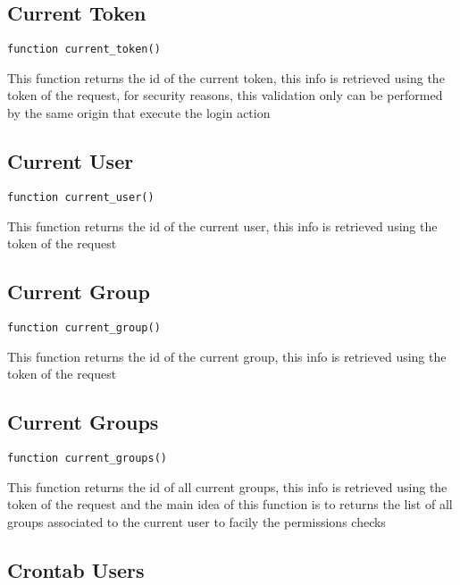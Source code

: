 \documentclass[a4paper]{book}
\begin{document}
\hypertarget{toc267}{}
\subsection{Current Token}

\begin{lstlisting}
function current_token()
\end{lstlisting}

This function returns the id of the current token, this info is retrieved
using the token of the request, for security reasons, this validation only
can be performed by the same origin that execute the login action

\hypertarget{toc268}{}
\subsection{Current User}

\begin{lstlisting}
function current_user()
\end{lstlisting}

This function returns the id of the current user, this info is retrieved
using the token of the request

\hypertarget{toc269}{}
\subsection{Current Group}

\begin{lstlisting}
function current_group()
\end{lstlisting}

This function returns the id of the current group, this info is retrieved
using the token of the request

\hypertarget{toc270}{}
\subsection{Current Groups}

\begin{lstlisting}
function current_groups()
\end{lstlisting}

This function returns the id of all current groups, this info is retrieved
using the token of the request and the main idea of this function is to
returns the list of all groups associated to the current user to facily the
permissions checks

\hypertarget{toc271}{}
\subsection{Crontab Users}
\end{document}

